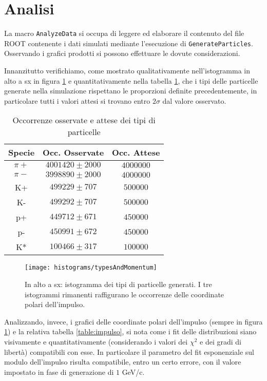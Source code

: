 \documentclass{article}
\begin{document}
\section{Analisi}
La macro \texttt{AnalyzeData} si occupa di leggere ed elaborare il contenuto del file ROOT contenente i dati simulati mediante l'esecuzione di \texttt{GenerateParticles}. Osservando i grafici prodotti si possono effettuare le dovute considerazioni.

Innanzitutto verifichiamo, come mostrato qualitativamente nell'istogramma in alto a sx in figura \ref{fig:tipi} e quantitativamente nella tabella \ref{table:tipi}, che i tipi delle particelle generate nella simulazione rispettano le proporzioni definite precedentemente, in particolare tutti i valori attesi si trovano entro $2\sigma$ dal valore osservato.

\begin{table}[h]
    \centering
    \begin{tabular}{||c|c|c||}
        \hline
            Specie & Occ. Osservate & Occ. Attese \\
        \hline \hline
            $\pi+$ & $4001420 \pm 2000$ & $4000000$ \\
        \hline
            $\pi-$ & $3998890 \pm 2000$ & $4000000$ \\
        \hline
            K+ & $499229 \pm 707$ & $500000$ \\
        \hline
            K- & $499292 \pm 707$ & $500000$ \\
        \hline
            p+ & $449712 \pm 671$ & $450000$ \\
        \hline
            p- & $450991 \pm 672$ & $450000$ \\
        \hline
            K* & $100466 \pm 317$ & $100000$ \\
        \hline
    \end{tabular}
    \caption{Occorrenze osservate e attese dei tipi di particelle}
    \label{table:tipi}
\end{table}

\begin{figure}[hb!]
    \centering
    \texttt{[image: histograms/typesAndMomentum]}
    \caption{In alto a sx: istogramma dei tipi di particelle generati. I tre istogrammi rimanenti raffigurano le occorrenze delle coordinate polari dell'impulso.}
    \label{fig:tipi}
\end{figure}

Analizzando, invece, i grafici delle coordinate polari dell'impulso (sempre in figura \ref{fig:tipi}) e la relativa tabella \ref{table:impulso}, si nota come i fit delle distribuzioni siano visivamente e quantitativamente (considerando i valori dei $\chi^2$ e dei gradi di libertà) compatibili con esse. In particolare il parametro del fit esponenziale sul modulo dell'impulso risulta compatibile, entro un certo errore, con il valore impostato in fase di generazione di $1$ GeV/c.
\end{document}
